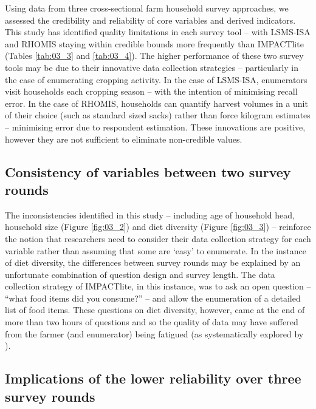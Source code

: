 Using data from three cross-sectional farm household survey approaches, we assessed the credibility and reliability of core variables and derived indicators. This study has identified quality limitations in each survey tool -- with LSMS-ISA and RHOMIS staying within credible bounds more frequently than IMPACTlite (Tables \ref{tab:03_3} and \ref{tab:03_4}). The higher performance of these two survey tools may be due to their innovative data collection strategies -- particularly in the case of enumerating cropping activity. In the case of LSMS-ISA, enumerators visit households each cropping season -- with the intention of minimising recall error. In the case of RHOMIS, households can quantify harvest volumes in a unit of their choice (such as standard sized sacks) rather than force kilogram estimates -- minimising error due to respondent estimation. These innovations are positive, however they are not sufficient to eliminate non-credible values.

\subsection{Consistency of variables between two survey rounds}

The inconsistencies identified in this study -- including age of household head, household size (Figure \ref{fig:03_2}) and diet diversity (Figure \ref{fig:03_3}) -- reinforce the notion that researchers need to consider their data collection strategy for each variable rather than assuming that some are `easy' to enumerate. In the instance of diet diversity, the differences between survey rounds may be explained by an unfortunate combination of question design and survey length. The data collection strategy of IMPACTlite, in this instance, was to ask an open question -- ``what food items did you consume?'' -- and allow the enumeration of a detailed list of food items. These questions on diet diversity, however, came at the end of more than two hours of questions and so the quality of data may have suffered from the farmer (and enumerator) being fatigued (as systematically explored by \citealp{Kilic2013}).

\subsection{Implications of the lower reliability over three survey rounds}

